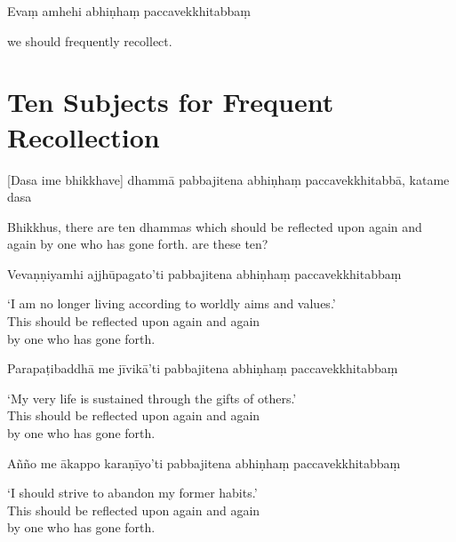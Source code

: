 Evaṃ amhehi abhiṇhaṃ paccavekkhitabbaṃ

\begin{english}
   we should frequently recollect.
\end{english}


\section{Ten Subjects for Frequent Recollection}


\begin{leader}
\end{leader}

[Dasa ime bhikkhave] dhammā pabbajitena abhiṇhaṃ paccavekkhitabbā, katame dasa

\begin{english}
  Bhikkhus, there are ten dhammas which should be reflected upon again and again by one who has gone forth.  are these ten?
\end{english}

Vevaṇṇiyamhi ajjhūpagato'ti pabbajitena abhiṇhaṃ paccavekkhitabbaṃ

\begin{english}
  `I am no longer living according to worldly aims and values.'\\
  This should be reflected upon again and again\\
  by one who has gone forth.
\end{english}

Parapaṭibaddhā me jīvikā'ti pabbajitena abhiṇhaṃ paccavekkhitabbaṃ

\begin{english}
  `My very life is sustained through the gifts of others.'\\
  This should be reflected upon again and again\\
  by one who has gone forth.
\end{english}

Añño me ākappo karaṇīyo'ti pabbajitena abhiṇhaṃ paccavekkhitabbaṃ

\begin{english}
  `I should strive to abandon my former habits.'\\
  This should be reflected upon again and again\\
  by one who has gone forth.
\end{english}

